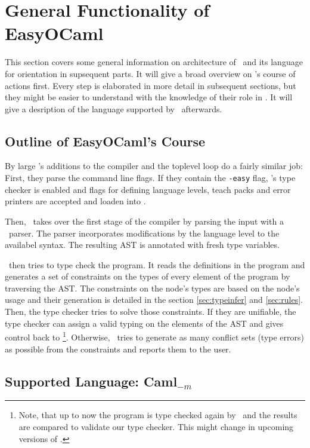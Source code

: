 
\section{General Functionality of EasyOCaml}

This section covers some general information on architecture of \easyocaml\ and
its language for orientation in supsequent parts.
It will give a broad overview on \easyocaml's course of actions first.
Every step is elaborated in more detail in subsequent sections, but they might
be easier to understand with the knowledge of their role in \easyocaml.
It will give a desription of the language supported by \easyocaml\ afterwards.

\subsection{Outline of EasyOCaml's Course}

By large \easyocaml's additions to the compiler and the toplevel loop do a
fairly similar job: First, they parse the command line flags. If they
contain the \texttt{-easy} flag, \easyocaml's type checker is enabled and flags
for defining language levels, teach packs and error printers are accepted and
loaden into \easyocaml.

Then, \easyocaml\ takes over the first stage of the compiler by parsing the
input with a \camlpf\ parser. The parser incorporates modifications by the
language level to the availabel syntax. The resulting AST is annotated with
fresh type variables.

\easyocaml\ then tries to type check the program. It reads the definitions in
the program and generates a set of constraints on the types of every element of
the program by traversing the AST. The constraints on the node's types are based
on the node's usage and their generation is detailed in the section
\ref{sec:typeinfer} and \ref{sec:rules}.
Then, the type checker tries to solve those constraints. If they are unifiable,
the type checker can assign a valid typing on the elements of the AST and gives
control back to \ocaml\footnote{Note, that up to now the program is type checked
again by \ocaml\ and the results are compared to validate our type checker. This
might change in upcoming versions of \easyocaml.}.
Otherwise, \easyocaml\ tries to generate as many conflict sets (type errors) as
possible from the constraints and reports them to the user.

\subsection{Supported Language: Caml$_{-m}$}
\label{sec:language}


